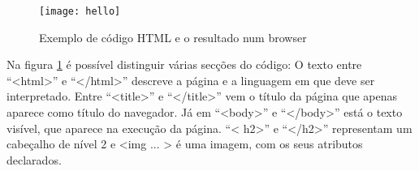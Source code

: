 \begin{figure}[hbtp]
	\centering
	\texttt{[image: hello]}
	\caption{Exemplo de código HTML e o resultado num browser}
	\label{fig:hello}
\end{figure}

Na figura \ref{fig:hello} é possível distinguir várias secções do código:
O texto entre ``<html>'' e ``</html>'' descreve a página e a linguagem em que deve ser interpretado.
Entre ``<title>'' e ``</title>'' vem o título da página que apenas aparece como título do navegador.
Já em ``<body>'' e ``</body>'' está o texto visível, que aparece na execução da página.
``< h2>'' e ``</h2>'' representam um cabeçalho de nível 2 e <img ... > é uma imagem, com os seus atributos declarados.